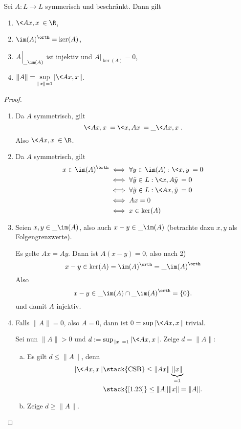 \begin{st} \label{3.3}
	Sei $A: L \to L$ symmerisch und beschränkt.
	Dann gilt
	\begin{enumerate}[1)]
		\item
			$\displaystyle \<Ax,x\> \in \R$,
		\item
			$\displaystyle \im(A)^\orth = \ker(A)$,
		\item
			$\displaystyle A \Big|_{\_{\im (A)} }$ ist injektiv und $A \Big|_{\ker(A)} = 0$,
		\item
			$\displaystyle \|A\| = \sup_{\|x\|=1} |\<Ax,x\>|$.
	\end{enumerate}
	\begin{proof}
		\begin{enumerate}[1)]
			\item
				Da $A$ symmetrisch, gilt
				\[
					\<Ax, x\> = \<x, Ax\> = \_{\<Ax,x\>}.
				\]
				Also $\<Ax, x\> \in \R$.
			\item
				Da $A$ symmetrisch, gilt
				\begin{align*}
					x \in \im(A)^\orth
					& \iff \forall y \in \im(A) : \<x,y\> = 0 \\
					& \iff \forall \tilde y \in L: \<x, A\tilde y\> = 0 \\
					& \iff \forall \tilde y \in L: \<Ax,\tilde y\> = 0 \\
					& \iff Ax = 0 \\
					& \iff x \in \ker(A)
				\end{align*}
			\item
				Seien $x,y \in \_{\im(A)}$, also auch $x-y \in \_{\im(A)}$ (betrachte dazu $x,y$ als Folgengrenzwerte).

				Es gelte $Ax = Ay$.
				Dann ist $A(x-y) = 0$, also nach 2)
				\[
					x-y \in \ker (A) = \im(A)^\orth = \_{\im(A)}^\orth
				\]
				Also 
				\[
					x-y \in \_{\im(A)} \cap \_{\im(A)}^\orth = \{0\}.
				\]
				und damit $A$ injektiv.
			\item
				Falls $\|A\| = 0$, also $A=0$, dann ist $0 = \sup |\<Ax,x\>|$ trivial.

				Sei nun $\|A\| > 0$ und $d := \sup_{\|x\|=1} |\<Ax,x\>|$.
				Zeige $d = \|A\|$:
				\begin{enumerate}[a)]
					\item
						Es gilt $d \le \|A\|$, denn
						\begin{align*}
							|\<Ax,x\>| 
							&\stack{\text{CSB}} \le \|Ax\| \underbrace{\|x\|}_{=1} \\
							&\stack{\ref{1.23}}\le \|A\| \|x\|
							= \|A\|.
						\end{align*}
					\item
						Zeige $d \ge \|A\|$.


\end{enumerate}
\end{enumerate}
\end{proof}
\end{st}
